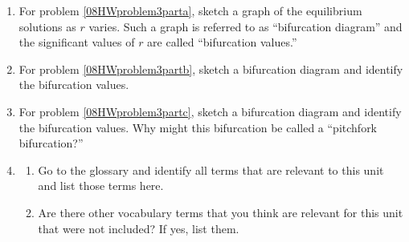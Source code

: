 \begin{enumerate}
\item For problem \ref{08HWproblem3parta}, sketch a graph of the equilibrium solutions as $r$ varies. Such a graph is referred to as ``bifurcation diagram'' and the significant values of $r$ are called ``bifurcation values.'' \label{08HWproblem4}
\item For problem \ref{08HWproblem3partb}, sketch a bifurcation diagram and identify the bifurcation values. \label{08HWproblem5}
\item For problem \ref{08HWproblem3partc}, sketch a bifurcation diagram and identify the bifurcation values. Why might this bifurcation be called a ``pitchfork bifurcation?'' \label{08HWproblem6}
\item \label{08HWproblem7}
\begin{enumerate}
\item Go to the glossary and identify all terms that are relevant to this unit and list those terms here.
\item Are there other vocabulary terms that you think are relevant for this unit that were not included? If yes, list them.
\end{enumerate}
\end{enumerate}



